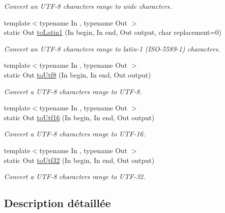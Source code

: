 \begin{DoxyCompactItemize}
\begin{DoxyCompactList}\small\item\em Convert an U\+T\+F-\/8 characters range to wide characters. \end{DoxyCompactList}\item 
{\footnotesize template$<$typename In , typename Out $>$ }\\static Out \hyperlink{classsf_1_1Utf_3_018_01_4_adf6f6e0a8ee0527c8ab390ce5c0b6b13}{to\+Latin1} (In begin, In end, Out output, char replacement=0)
\begin{DoxyCompactList}\small\item\em Convert an U\+T\+F-\/8 characters range to latin-\/1 (I\+S\+O-\/5589-\/1) characters. \end{DoxyCompactList}\item 
{\footnotesize template$<$typename In , typename Out $>$ }\\static Out \hyperlink{classsf_1_1Utf_3_018_01_4_aef68054cab6a592c0b04de94e93bb520}{to\+Utf8} (In begin, In end, Out output)
\begin{DoxyCompactList}\small\item\em Convert a U\+T\+F-\/8 characters range to U\+T\+F-\/8. \end{DoxyCompactList}\item 
{\footnotesize template$<$typename In , typename Out $>$ }\\static Out \hyperlink{classsf_1_1Utf_3_018_01_4_a925ac9e141dcb6f9b07c7b95f7cfbda2}{to\+Utf16} (In begin, In end, Out output)
\begin{DoxyCompactList}\small\item\em Convert a U\+T\+F-\/8 characters range to U\+T\+F-\/16. \end{DoxyCompactList}\item 
{\footnotesize template$<$typename In , typename Out $>$ }\\static Out \hyperlink{classsf_1_1Utf_3_018_01_4_a79395429baba13dd04a8c1fba745ce65}{to\+Utf32} (In begin, In end, Out output)
\begin{DoxyCompactList}\small\item\em Convert a U\+T\+F-\/8 characters range to U\+T\+F-\/32. \end{DoxyCompactList}\end{DoxyCompactItemize}


\subsection{Description détaillée}

